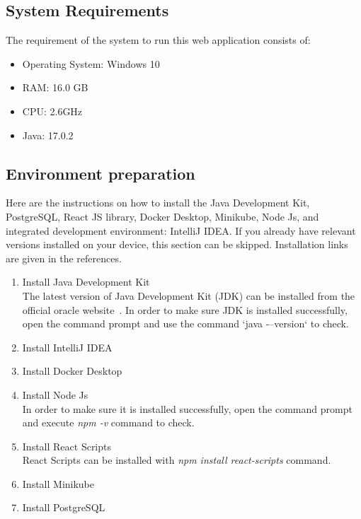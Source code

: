 \subsection{System Requirements}

The requirement of the system to run this web application consists of:
\begin{itemize}
  \item Operating System: Windows 10
  \item RAM: 16.0 GB
  \item CPU: 2.6GHz
  \item Java: 17.0.2
\end{itemize}

\subsection{Environment preparation}
Here are the instructions on how to install the Java Development Kit, PostgreSQL, React JS library, Docker Desktop, Minikube, Node Js, and integrated development environment: IntelliJ IDEA. If you already have relevant versions installed on your device, this section can be skipped. Installation links are given in the references.

\begin{enumerate}
  \item Install Java Development Kit \\
    The latest version of Java Development Kit (JDK) can be installed from the official oracle website~\cite{jdk}. In order to make sure JDK is installed successfully, open the command prompt and use the command `java -–version` to check.
    
  \item Install IntelliJ IDEA~\cite{intellij-idea}
	
  \item Install Docker Desktop~\cite{docker-desktop}

  \item Install Node Js~\cite{node-js}\\
	In order to make sure it is installed successfully, open the command prompt and	execute \emph{npm -v} command to check.
	
  \item Install React Scripts \\
    React Scripts can be installed with \emph{npm install react-scripts} command.
    
  \item Install Minikube~\cite{minikube}
	
  \item Install PostgreSQL~\cite{postgresql-download}
\end{enumerate}

